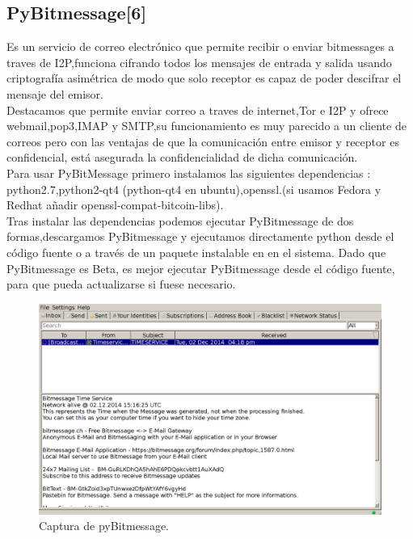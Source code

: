 \documentclass{article}
\begin{document}
\subsection{PyBitmessage[6]}
Es un servicio de correo electrónico que permite recibir o enviar bitmessages a traves de I2P,funciona cifrando todos los mensajes de entrada y salida
usando criptografía asimétrica de modo que solo receptor es capaz de poder descifrar el mensaje del emisor.
\\

Destacamos que permite enviar correo a traves de internet,Tor e I2P y ofrece webmail,pop3,IMAP y SMTP,su funcionamiento es muy parecido a un cliente de correos
pero con las ventajas de que la comunicación entre  emisor y receptor es confidencial, está asegurada la confidencialidad de dicha comunicación.  
\\

Para usar PyBitMessage  primero instalamos las siguientes dependencias : python2.7,python2-qt4 (python-qt4 en ubuntu),openssl.(si usamos  Fedora y Redhat añadir openssl-compat-bitcoin-libs).
\\

Tras instalar las dependencias podemos ejecutar PyBitmessage de dos formas,descargamos PyBitmessage y ejecutamos directamente python desde el código fuente o a través de un paquete 
instalable en en el sistema. Dado que PyBitmessage es Beta, es mejor  ejecutar PyBitmessage desde el código fuente, para que pueda actualizarse si fuese necesario.
\\

\begin{figure}[H]
    \includegraphics[]{media/PyBitMessage-client.png}
    \caption{Captura de pyBitmessage.}
    \label{fig5}
\end{figure}
\end{document}
